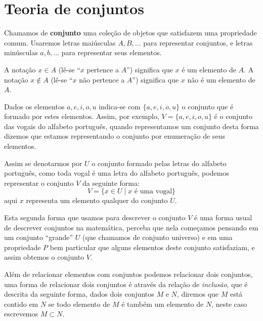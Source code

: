 
\chapter{Teoria de conjuntos}


Chamamos de \textbf{conjunto} uma coleção de objetos que satisfazem uma propriedade comum. Usaremos letras maiúsculas $A, B, \ldots$ para representar  conjuntos, e letras minúsculas $a, b, \ldots$ para representar seus elementos.

A notação $x \in A$ (lê-se ``$x$ pertence a $A$'') significa que $x$ é um elemento de $A$. A notação $x \notin A$ (lê-se ``$x$ não pertence a $A$'') significa que $x$ não é um elemento de $A$.

Dados os elementos $a, e, i, o, u$ indica-se com $\{a, e, i, o, u\}$ o conjunto que é formado por estes elementos. Assim, por exemplo, $V= \{a, e, i, o, u\}$ é o conjunto das vogais do alfabeto português, quando representamos um conjunto desta forma dizemos que estamos representando o conjunto por enumeração de seus elementos.

Assim se denotarmos por $U$ o conjunto formado pelas letras do alfabeto português, como toda vogal é uma letra do alfabeto português, podemos representar o conjunto $V$ da seguinte forma:
\begin{equation}
V= \{x \in U \mid x \text{ é uma vogal}\}
\end{equation}
aqui $x$ representa um elemento qualquer do conjunto $U$.

Esta segunda forma que usamos para descrever o conjunto $V$ é uma forma usual de descrever conjuntos na matemática, perceba que nela começamos pensando em um conjunto ``grande'' $U$ (que chamamos de conjunto universo) e em uma propriedade $P$ bem particular que alguns elementos deste conjunto satisfaziam, e assim obtemos o conjunto $V$.

Além de relacionar elementos com conjuntos podemos relacionar dois conjuntos, uma forma de relacionar dois conjuntos é através da relação de \textit{inclusão}, que é descrita da seguinte forma, dados dois conjuntos $M$ e $N$, diremos que $M$ está contido em $N$ se todo elemento de $M$ é também um elemento de $N$, neste caso escrevemos $M \subset N$.


